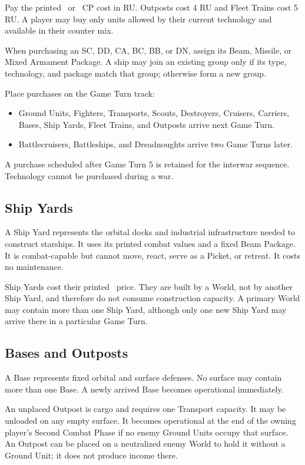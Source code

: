 Pay the printed \SpaceEmpires\ or \CloseEncounters\ CP cost in RU. Outposts
cost 4 RU and Fleet Trains cost 5 RU. A player may buy only units allowed by
their current technology and available in their counter mix.

When purchasing an SC, DD, CA, BC, BB, or DN, assign its Beam, Missile, or
Mixed Armament Package. A ship may join an existing group only if its type,
technology, and package match that group; otherwise form a new group.

Place purchases on the Game Turn track:

\begin{itemize}
  \item Ground Units, Fighters, Transports, Scouts, Destroyers, Cruisers,
    Carriers, Bases, Ship Yards, Fleet Trains, and Outposts arrive next Game
    Turn.
  \item Battlecruisers, Battleships, and Dreadnoughts arrive two Game Turns
    later.
\end{itemize}

A purchase scheduled after Game Turn 5 is retained for the interwar sequence.
Technology cannot be purchased during a war.

\subsection{Ship Yards}

A Ship Yard represents the orbital docks and industrial infrastructure needed
to construct starships. It uses its printed combat values and a fixed Beam
Package. It is combat-capable but cannot move, react, serve as a Picket, or
retreat. It costs no maintenance.

Ship Yards cost their printed \SpaceEmpires\ price. They are built by a World,
not by another Ship Yard, and therefore do not consume construction capacity.
A primary World may contain more than one Ship Yard, although only one new
Ship Yard may arrive there in a particular Game Turn.

\subsection{Bases and Outposts}

A Base represents fixed orbital and surface defenses. No surface may contain
more than one Base. A newly arrived Base becomes operational immediately.

An unplaced Outpost is cargo and requires one Transport capacity. It may be
unloaded on any empty surface. It becomes operational at the end of the owning
player's Second Combat Phase if no enemy Ground Units occupy that surface.
An Outpost can be placed on a neutralized enemy World to hold it without a
Ground Unit; it does not produce income there.
